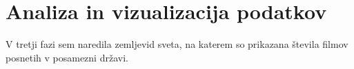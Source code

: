 \documentclass[11pt,a4paper]{article}
\begin{document}




\section{Analiza in vizualizacija podatkov}

V tretji fazi sem naredila zemljevid sveta, na katerem so prikazana števila filmov posnetih v posamezni državi.

\begin{figure}[H]

\end{figure}


\end{document}
